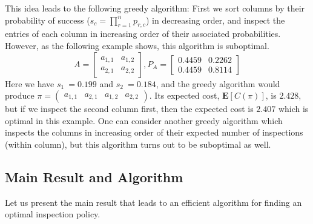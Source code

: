  This idea leads to the following greedy algorithm: First we sort columns by their probability of success ($s_c = \prod_{r=1}^{n} p_{r,c}$) in decreasing order, and inspect the entries of each column in increasing order of their associated probabilities. However, as the following example shows, this algorithm is suboptimal. 
 \begin{equation*}
 A = 
 	\begin{bmatrix}
 		a_{1,1}  & a_{1, 2} \\
 		a_{2,1}  & a_{2, 2}
 	\end{bmatrix},
 	P_A =
 	\begin{bmatrix}
 		0.4459  & 0.2262 \\
 		0.4459  & 0.8114
 	\end{bmatrix}
 \end{equation*}
 Here we have $s_1 ~= 0.199$ and $s_2 ~= 0.184$, and the greedy algorithm would produce $\pi = \begin{pmatrix} a_{1,1} & a_{2,1} & a_{1,2} & a_{2,2} \end{pmatrix}$. Its expected cost, $\mathbf{E}[C(\pi)]$, is $2.428$, but if we inspect the second column first, then the expected cost is $2.407$ which is optimal in this example.
 One can consider another greedy algorithm which inspects the columns in increasing order of their expected number of inspections (within column), but this algorithm turns out to be suboptimal as well. 


 \subsection{Main Result and Algorithm}
 Let us present the main result that leads to an efficient algorithm for finding an optimal inspection policy. 

